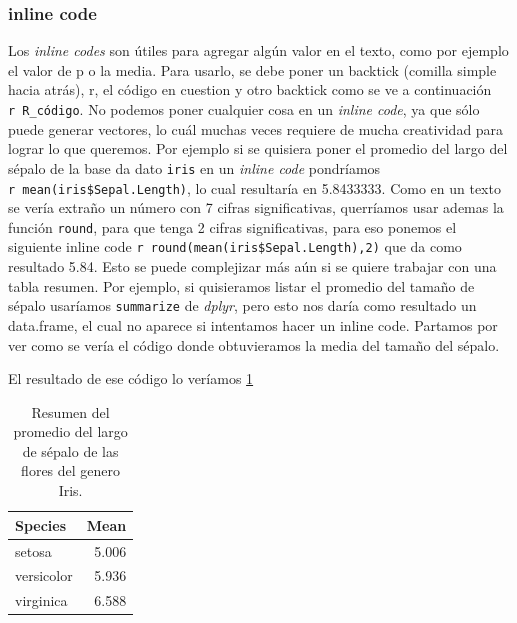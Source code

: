 \documentclass[]{book}
\newenvironment{Shaded}{\begin{snugshade}}{\end{snugshade}}
\newcommand{\DataTypeTok}[1]{\textcolor[rgb]{0.13,0.29,0.53}{#1}}
\newcommand{\KeywordTok}[1]{\textcolor[rgb]{0.13,0.29,0.53}{\textbf{#1}}}
\newcommand{\NormalTok}[1]{#1}
\newcommand{\OperatorTok}[1]{\textcolor[rgb]{0.81,0.36,0.00}{\textbf{#1}}}
\newcommand{\StringTok}[1]{\textcolor[rgb]{0.31,0.60,0.02}{#1}}
\begin{document}
\hypertarget{inline-code}{%
\subsubsection{inline code}\label{inline-code}}

Los \emph{inline codes} son útiles para agregar algún valor en el texto,
como por ejemplo el valor de p o la media. Para usarlo, se debe poner un
backtick (comilla simple hacia atrás), r, el código en cuestion y otro
backtick como se ve a continuación
\texttt{\textasciigrave{}r\ R\_código\textasciigrave{}}. No podemos
poner cualquier cosa en un \emph{inline code}, ya que sólo puede generar
vectores, lo cuál muchas veces requiere de mucha creatividad para lograr
lo que queremos. Por ejemplo si se quisiera poner el promedio del largo
del sépalo de la base da dato \texttt{iris} en un \emph{inline code}
pondríamos
\texttt{\textasciigrave{}r\ mean(iris\$Sepal.Length)\textasciigrave{}},
lo cual resultaría en 5.8433333. Como en un texto se vería extraño un
número con 7 cifras significativas, querríamos usar ademas la función
\texttt{round}, para que tenga 2 cifras significativas, para eso ponemos
el siguiente inline code
\texttt{\textasciigrave{}r\ round(mean(iris\$Sepal.Length),2)\textasciigrave{}}
que da como resultado 5.84. Esto se puede complejizar más aún si se
quiere trabajar con una tabla resumen. Por ejemplo, si quisieramos
listar el promedio del tamaño de sépalo usaríamos \texttt{summarize} de
\emph{dplyr}, pero esto nos daría como resultado un data.frame, el cual
no aparece si intentamos hacer un inline code. Partamos por ver como se
vería el código donde obtuvieramos la media del tamaño del sépalo.

\begin{Shaded}
\end{Shaded}

El resultado de ese código lo veríamos \ref{tab:SummarySepaltab}

\begin{table}

\caption{\label{tab:SummarySepaltab}Resumen del promedio del largo de sépalo de las flores del genero Iris.}
\centering
\begin{tabular}[t]{lr}
\toprule
Species & Mean\\
\midrule
setosa & 5.006\\
versicolor & 5.936\\
virginica & 6.588\\
\bottomrule
\end{tabular}
\end{table}
\end{document}
